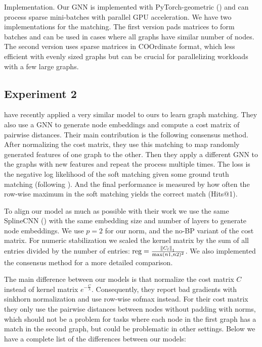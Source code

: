 Implementation. Our GNN is implemented with PyTorch-geometric (\citealp{pytorchgeometric}) and can process sparse mini-batches with parallel GPU acceleration. We have two implementations for the matching. The first version pads matrices to form batches and can be used in cases where all graphs have similar number of nodes. The second version uses sparse matrices in COOrdinate format, which less efficient with evenly sized graphs but can be crucial for parallelizing workloads with a few large graphs.

\subsection{Experiment 2}

\cite{fey2020_update} have recently applied a very similar model to ours to learn graph matching. They also use a GNN to generate node embeddings and compute a cost matrix of pairwise distances. Their main contribution is the following consensus method. After normalizing the cost matrix, they use this matching to map randomly generated features of one graph to the other. Then they apply a different GNN to the graphs with new features and repeat the process multiple times. The loss is the negative log likelihood of the soft matching given some ground truth matching (following \citealp{wang2019}). And the final performance is measured by how often the row-wise maximum in the soft matching yields the correct match (Hits@1).

To align our model as much as possible with their work we use the same SplineCNN (\citealp{spline2018}) with the same embedding size and number of layers to generate node embeddings. We use $p=2$ for our norm, and the no-BP variant of the cost matrix. For numeric stabilization we scaled the kernel matrix by the sum of all entries divided by the number of entries: $\text{reg} = \frac{\norm{C_l}_1}{\max(n1,n2)^2}$. We also implemented the consensus method for a more detailed comparison.

The main difference between our models is that \cite{fey2020_update} normalize the cost matrix $C$ instead of kernel matrix $e^{-\frac{C}{\lambda}}$. Consequently, they report bad gradients with sinkhorn normalization and use row-wise sofmax instead. For their cost matrix they only use the pairwise distances between nodes without padding with norms, which should not be a problem for tasks where each node in the first graph has a match in the second graph, but could be problematic in other settings. Below we have a complete list of the differences between our models:

